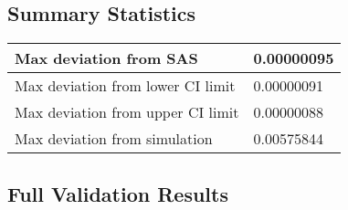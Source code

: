 \documentclass{glimmpse-report}
\begin{document}
\subsection{Summary Statistics}
\begin{tabular}{|l|l|}
\hline
Max deviation from SAS & 0.00000095\tabularnewline
\hline

Max deviation from lower CI limit & 0.00000091\tabularnewline
\hline

Max deviation from upper CI limit & 0.00000088\tabularnewline
\hline

Max deviation from simulation & 0.00575844\tabularnewline
\hline

\end{tabular}
\subsection{Full Validation Results}
\end{document}
